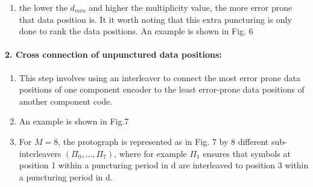\documentclass[fontsize=12pt]{article}
\begin{document}
\begin{enumerate}
\begin{enumerate}
\item the lower the $d_{min}$ and higher the multiplicity value, the more error prone that data position is. It it worth noting that this extra puncturing is only done to rank the data positions. An example is shown in Fig. 6
\end{enumerate}

\paragraph{2. Cross connection of unpunctured data positions:}
\begin{enumerate}
\item This step involves using an interleaver to connect the  most error prone data positions of one component encoder to the least error-prone data positions of another component code.

\item An example is shown in Fig.7

\item For $M = 8$,
the protograph is represented as in Fig. 7 by 8 different
sub-interleavers $(\Pi_0,...,\Pi_7)$, where for example 
$\Pi_1$
ensures that symbols at position 1 within a puncturing
period in d are interleaved to position 3 within a
puncturing period in d.
\end{enumerate}
\end{enumerate}
\end{document}
